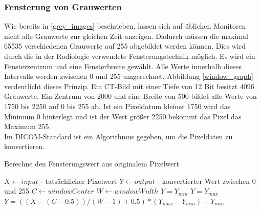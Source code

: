 \subsubsection{Fensterung von Grauwerten} \label{windowing}

Wie bereits in \ref{grey_images} beschrieben, lassen sich auf üblichen Monitoren nicht alle Grauwerte zur gleichen Zeit anzeigen. Dadurch müssen die maximal 65535 verschiedenen Grauwerte auf 255 abgebildet werden können. Dies wird durch die in der Radiologie verwendete Fensterungstechnik möglich\cite[Kapitel 8, Seite 249]{handels:mbv}. Es wird ein Fensterzentrum und eine Fensterbreite gewählt. Alle Werte innerhalb dieses Intervalls werden zwischen 0 und 255 umgerechnet. Abbildung \ref{window_graph} verdeutlicht dieses Prinzip. Ein CT-Bild mit einer Tiefe von 12 Bit besitzt 4096 Grauwerte. Ein Zentrum von 2000 und eine Breite von 500 bildet alle Werte von 1750 bis 2250 auf 0 bis 255 ab. Ist ein Pixeldatum kleiner 1750 wird das Minimum 0 hinterlegt und ist der Wert größer 2250 bekommt das Pixel das Maximum 255.\\
Im DICOM-Standard ist ein Algorithmus gegeben, um die Pixeldaten zu konvertieren\cite[C.11.2.1.2]{dicom:iod}.

\begin{algorithm}
\caption{Berechne den Fensterungswert aus originalem Pixelwert}
\begin{algorithmic}[1] 
\STATE $X \leftarrow input$ - tatsächlicher Pixelwert
\STATE $Y \leftarrow output$ - konvertierter Wert zwischen 0 und 255
\STATE $C \leftarrow windowCenter$
\STATE $W \leftarrow windowWidth$
	\STATE  $Y = Y_{min}$
	\STATE $Y = Y_{max}$
\ELSE
	\STATE $Y = ((X-(C-0.5)) / (W-1)+0.5)*(Y_{max}-Y_{min})+Y_{min}$
\ENDIF
\end{algorithmic}
\end{algorithm}


